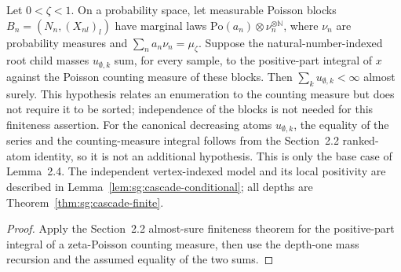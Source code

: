 \begin{lemma}\label{lem:sg:cascade-depth-one}
  \leanok
Let $0<\zeta<1$. On a probability space, let measurable Poisson blocks
$B_n=(N_n,(X_{nl})_l)$ have marginal laws
$\mathrm{Po}(a_n)\otimes\nu_n^{\otimes\mathbb N}$, where $\nu_n$ are
probability measures and $\sum_n a_n\nu_n=\mu_\zeta$.
Suppose the natural-number-indexed root child masses $u_{\emptyset,k}$
sum, for every sample, to the positive-part integral of $x$ against the
Poisson counting measure of these blocks. Then
$\sum_k u_{\emptyset,k}<\infty$ almost surely. This hypothesis relates
an enumeration to the counting measure but does not require it to be sorted;
independence of the blocks is not needed for this finiteness assertion.
For the canonical decreasing atoms $u_{\emptyset,k}$, the equality of the
series and the counting-measure integral follows from the Section~2.2
ranked-atom identity, so it is not an additional hypothesis.
This is only the base case of Lemma~2.4. The independent vertex-indexed
model and its local positivity are described in Lemma~\ref{lem:sg:cascade-conditional};
all depths are Theorem~\ref{thm:sg:cascade-finite}.
\end{lemma}
\begin{proof}
  \leanok
Apply the Section~2.2 almost-sure finiteness theorem for the positive-part
integral of a zeta-Poisson counting measure, then use the depth-one mass
recursion and the assumed equality of the two sums.
\end{proof}

